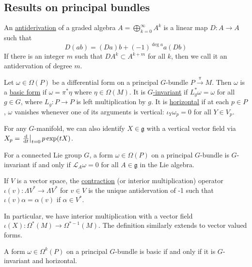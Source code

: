 \subsection{Results on principal bundles}
\begin{defn} %
	An \underline{antiderivation} of a graded algebra $A=\bigoplus_{k=0}^\infty
	A^k$ is a linear map $D : A\to A$ such that 
	 \[
	D(ab) = (Da)b + (-1)^{\deg a} a(Db)
	\] 
	If there is an integer $m$ such that  $D A^k \subset A^{k+m}$ for all $k$,
	then we call it an antidervation of degree  $m$.
\end{defn}
\begin{defn} 
	Let  $\omega\in \Omega(P)$ be a differential form on a principal $G$-bundle
	$P\xrightarrow{\pi} M$. 
	Then $\omega$ is a \underline{basic form} if  $\omega = \pi^*\eta$
	where  $\eta\in\Omega(M)$. 
	It is \underline{$G$-invariant} if $L^*_g \omega =\omega$ for all  $g\in G$,
	where $L_g : P\to P$ is left multiplication by  $g$.
	It is \underline{horizontal} if at each $p\in P$,
    $\omega$ vanishes whenever one of its arguments is vertical:
	$\iota_Y\omega_p = 0$ for all  $Y\in V_p$.
\end{defn}
\noindent
For any $G$-manifold, we can also identify $X\in \mathfrak{g}$ with 
a vertical vector field via $X_p = \odv{}{t}_{t=0} p \exp (t X)$. 
\begin{thm} %
	For a connected Lie group $G$, a form $\omega\in \Omega(P)$ on a principal
	 $G$-bundle is  $G$-invariant if and only if  $\mathcal{L}_A\omega=0$ for
	 all $A\in\mathfrak{g}$ in the Lie algebra.
\end{thm}
\begin{defn} \label{def:contraction} %
	If $V$ is a vector space, the \underline{contraction} (or interior
	multiplication) operator $\iota(v) :
	\Lambda V^* \to \Lambda V^*$ for $v\in V$ is the unique antidervation of -1 
	such that $\iota(v)\alpha = \alpha(v)$ if  $\alpha\in V^*$.
\end{defn}
\noindent
In particular, we have interior multiplication with a vector
field $\iota(X) : \Omega^*(M) \to \Omega^{*-1}(M)$.
The definition similarly extends to vector valued forms.

\begin{thm} %
	A form  $\omega\in\Omega^k(P)$ on a principal $G$-bundle is 
	basic if and only if it is $G$-invariant and horizontal.
\end{thm}

